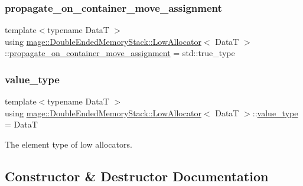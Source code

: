 \subsubsection{\texorpdfstring{propagate\+\_\+on\+\_\+container\+\_\+move\+\_\+assignment}{propagate\_on\_container\_move\_assignment}}
{\footnotesize\ttfamily template$<$typename DataT $>$ \\
using \hyperlink{classmage_1_1_double_ended_memory_stack_1_1_low_allocator}{mage\+::\+Double\+Ended\+Memory\+Stack\+::\+Low\+Allocator}$<$ DataT $>$\+::\hyperlink{classmage_1_1_double_ended_memory_stack_1_1_low_allocator_aa74eb72275d390ec7b1169602b338c5d}{propagate\+\_\+on\+\_\+container\+\_\+move\+\_\+assignment} =  std\+::true\+\_\+type}

\hypertarget{classmage_1_1_double_ended_memory_stack_1_1_low_allocator_a76b57f9b67a84b4e09def8ce54451acb}{}\label{classmage_1_1_double_ended_memory_stack_1_1_low_allocator_a76b57f9b67a84b4e09def8ce54451acb} 
\subsubsection{\texorpdfstring{value\+\_\+type}{value\_type}}
{\footnotesize\ttfamily template$<$typename DataT $>$ \\
using \hyperlink{classmage_1_1_double_ended_memory_stack_1_1_low_allocator}{mage\+::\+Double\+Ended\+Memory\+Stack\+::\+Low\+Allocator}$<$ DataT $>$\+::\hyperlink{classmage_1_1_double_ended_memory_stack_1_1_low_allocator_a76b57f9b67a84b4e09def8ce54451acb}{value\+\_\+type} =  DataT}

The element type of low allocators. 

\subsection{Constructor \& Destructor Documentation}
\hypertarget{classmage_1_1_double_ended_memory_stack_1_1_low_allocator_ad2de0c8d250130d5bd9c730f4ff5726c}{}\label{classmage_1_1_double_ended_memory_stack_1_1_low_allocator_ad2de0c8d250130d5bd9c730f4ff5726c} 
